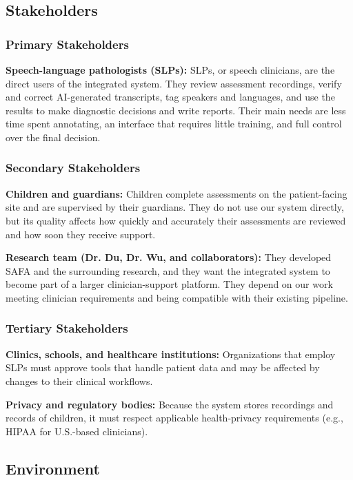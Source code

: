 \documentclass{article}
\begin{document}
\subsection{Stakeholders}

\subsubsection{Primary Stakeholders}
\textbf{Speech-language pathologists (SLPs):} SLPs, or speech clinicians, are the direct users of the integrated system.
They review assessment recordings, verify and correct AI-generated transcripts,
tag speakers and languages, and use the results to make diagnostic decisions and
write reports. Their main needs are less time spent annotating, an interface
that requires little training, and full control over the final decision.

\subsubsection{Secondary Stakeholders}
\textbf{Children and guardians:} Children complete assessments on the
patient-facing site and are supervised by their guardians. They do not use our system
directly, but its quality affects how quickly and accurately their assessments
are reviewed and how soon they receive support.

\textbf{Research team (Dr. Du, Dr. Wu, and collaborators):} They
developed SAFA and the surrounding research, and they want the integrated
system to become part of a larger clinician-support platform. They depend on our
work meeting clinician requirements and being compatible with their existing pipeline.

\subsubsection{Tertiary Stakeholders}
\textbf{Clinics, schools, and healthcare institutions:} Organizations that
employ SLPs must approve tools that handle patient data and may be affected by
changes to their clinical workflows.

\textbf{Privacy and regulatory bodies:} Because the system stores recordings
and records of children, it must respect applicable health-privacy
requirements (e.g., HIPAA for U.S.-based clinicians).

\subsection{Environment}
\end{document}
